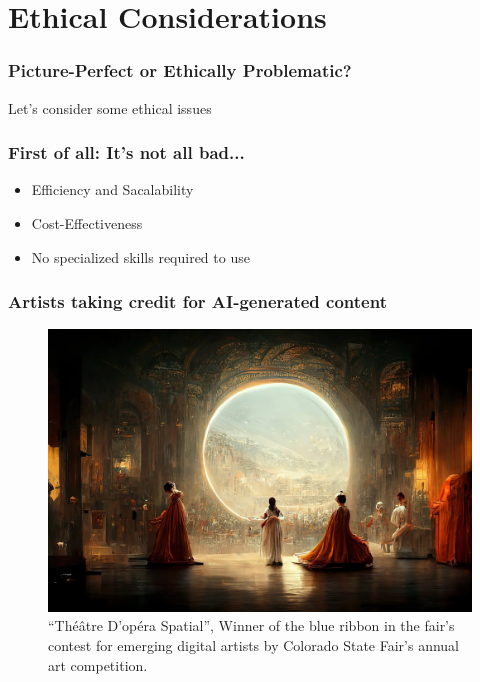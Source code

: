 \documentclass[
	11pt, compress%
]{beamer}
\begin{document}
\section{Ethical Considerations}
\begin{frame}
\begin{center}
	\frametitle{Picture-Perfect or Ethically Problematic?}
	\huge Let's consider some ethical issues
\end{center}
\end{frame}

\begin{frame}
	\frametitle{First of all: It's not all bad...}
	\begin{itemize}
		\setlength\itemsep{2em}
		\item Efficiency and Sacalability
		\item Cost-Effectiveness
		\item No specialized skills required to use
	\end{itemize}
\end{frame}

\begin{frame}
		\frametitle{Artists taking credit for AI-generated content}
		\begin{figure}
			\includegraphics[width=0.78\linewidth]{Images/ColoradoStateFairWinner.png}
			\caption{\tiny “Théâtre D’opéra Spatial”, Winner of the blue ribbon in the fair’s contest for emerging digital artists by Colorado State Fair’s annual art competition\cite{OperaSpecial}.}
		\end{figure}
	\end{frame}
\end{document}
